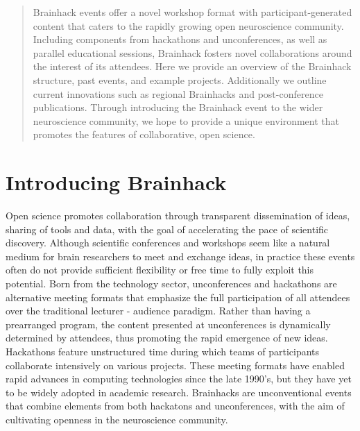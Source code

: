 \documentclass[11pt]{bmc_article_s50}
\begin{document}
\begin{abstract} %
Brainhack events offer a novel workshop format with participant-generated content that caters to the rapidly growing open neuroscience community. Including components from hackathons and unconferences, as well as parallel educational sessions, Brainhack fosters novel collaborations around the interest of its attendees. Here we provide an overview of the Brainhack structure, past events, and example projects. Additionally we outline current innovations such as regional Brainhacks and post-conference publications. Through introducing the Brainhack event to the wider neuroscience community, we hope to provide a unique environment that promotes the features of collaborative, open science.

\end{abstract}


\section{Introducing Brainhack}

Open science promotes collaboration through transparent dissemination of ideas, sharing of tools and data, with the goal of accelerating the pace of scientific discovery. 
Although scientific conferences and workshops seem like a natural medium for brain researchers to meet and exchange ideas, in practice these events often do not provide sufficient flexibility or free time to fully exploit this potential. 
Born from the technology sector, unconferences and hackathons are alternative meeting formats that emphasize the full participation of all attendees over the traditional lecturer - audience paradigm. 
Rather than having a prearranged program, the content presented at unconferences is dynamically determined by attendees, thus promoting the rapid emergence of new ideas.
Hackathons feature unstructured time during which teams of participants collaborate intensively on various projects. 
These meeting formats have enabled rapid advances in computing technologies since the late 1990's, but they have yet to be widely adopted in academic research. Brainhacks are unconventional events that combine elements from both hackatons and unconferences, with the aim of cultivating openness in the neuroscience community.
\end{document}
